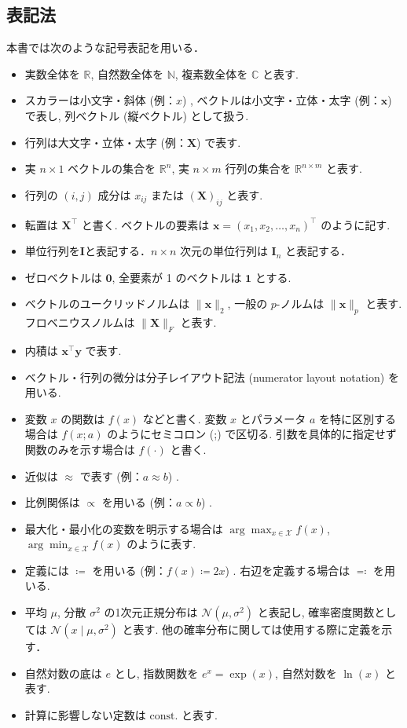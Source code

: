 \documentclass[titlepage]{ltjsbook}
\begin{document}
\subsection{表記法}
本書では次のような記号表記を用いる．
\begin{itemize}
\item 実数全体を $\mathbb{R}$, 自然数全体を $\mathbb{N}$, 複素数全体を $\mathbb{C}$ と表す. 
\item スカラーは小文字・斜体 (例：$x$) , ベクトルは小文字・立体・太字 (例：$\mathbf{x}$) で表し, 列ベクトル (縦ベクトル) として扱う. 
\item 行列は大文字・立体・太字 (例：$\mathbf{X}$) で表す. 
\item 実 $n\times 1$ ベクトルの集合を $\mathbb{R}^n$, 実 $n\times m$ 行列の集合を $\mathbb{R}^{n\times m}$ と表す. 
\item 行列の $(i,j)$ 成分は $x_{ij}$ または $(\mathbf{X})_{ij}$ と表す. 
\item 転置は $\mathbf{X}^\top$ と書く. ベクトルの要素は $\mathbf{x} = (x_1, x_2, \dots, x_n)^\top$ のように記す. 
\item 単位行列を$\mathbf{I}$と表記する．$n \times n$ 次元の単位行列は $\mathbf{I}_n$ と表記する．
\item ゼロベクトルは $\mathbf{0}$, 全要素が 1 のベクトルは $\mathbf{1}$ とする. 
\item ベクトルのユークリッドノルムは $\|\mathbf{x} \|_2$, 一般の $p$-ノルムは $\| \mathbf{x} \|_p$ と表す. フロベニウスノルムは $\| \mathbf{X} \|_F$ と表す. 
\item 内積は $\mathbf{x}^\top \mathbf{y}$ で表す. 
\item ベクトル・行列の微分は分子レイアウト記法 (numerator layout notation) を用いる. 
\item 変数 $x$ の関数は $f(x)$ などと書く. 変数 $x$ とパラメータ $a$ を特に区別する場合は $f(x; a)$ のようにセミコロン (;) で区切る. 引数を具体的に指定せず関数のみを示す場合は $f(\cdot)$ と書く. 
\item 近似は $\approx$ で表す (例：$a \approx b$) . 
\item 比例関係は $\propto$ を用いる (例：$a \propto b$) . 
\item 最大化・最小化の変数を明示する場合は $\arg\max_{x \in \mathcal{X}} f(x)$, $\arg\min_{x \in \mathcal{X}} f(x)$ のように表す. 
\item 定義には $\coloneqq$ を用いる (例：$f(x) \coloneqq 2x$) . 右辺を定義する場合は $\eqqcolon$ を用いる. 
\item 平均 $\mu$, 分散 $\sigma^2$ の1次元正規分布は $\mathcal{N}(\mu, \sigma^2)$ と表記し, 確率密度関数としては $\mathcal{N}(x \mid \mu, \sigma^2)$ と表す. 他の確率分布に関しては使用する際に定義を示す．
\item 自然対数の底は $e$ とし, 指数関数を $e^x = \exp(x)$, 自然対数を $\ln(x)$ と表す. 
\item 計算に影響しない定数は $\mathrm{const.}$ と表す. 
\end{itemize}

\printbibliography[segment=\therefsegment,heading=subbibliography,title={参考文献}]
\end{document}
